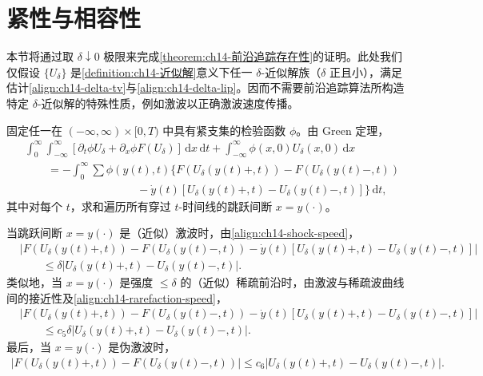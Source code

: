 \documentclass[../../main.tex]{subfiles}
\begin{document}
\section{紧性与相容性}\label{section:ch14-紧性与相容性}

本节将通过取 $\delta\downarrow0$ 极限来完成\cref{theorem:ch14-前沿追踪存在性}的证明。此处我们仅假设 $\{U_\delta\}$ 是\cref{definition:ch14-近似解}意义下任一 $\delta$-近似解族（$\delta$ 正且小），满足估计\eqref{align:ch14-delta-tv}与\eqref{align:ch14-delta-lip}。因而不需要前沿追踪算法所构造特定 $\delta$-近似解的特殊性质，例如激波以正确激波速度传播。

固定任一在 $(-\infty,\infty)\times[0,T)$ 中具有紧支集的检验函数 $\phi$。由 Green 定理，
\begin{align}
&\int_0^\infty\int_{-\infty}^\infty[\partial_t\phi U_\delta+\partial_x\phi F(U_\delta)]\,\mathrm{d}x\,\mathrm{d}t+\int_{-\infty}^\infty\phi(x,0)U_\delta(x,0)\,\mathrm{d}x\nonumber\\
&\qquad=-\int_0^\infty\sum\phi(y(t),t)\{F(U_\delta(y(t)+,t))-F(U_\delta(y(t)-,t))\nonumber\\
&\qquad\qquad\qquad\qquad\qquad-\dot y(t)[U_\delta(y(t)+,t)-U_\delta(y(t)-,t)]\}\,\mathrm{d}t,
\label{align:ch14-green}
\end{align}
其中对每个 $t$，求和遍历所有穿过 $t$-时间线的跳跃间断 $x=y(\cdot)$。

当跳跃间断 $x=y(\cdot)$ 是（近似）激波时，由\eqref{align:ch14-shock-speed}，
\begin{align}
&|F(U_\delta(y(t)+,t))-F(U_\delta(y(t)-,t))-\dot y(t)[U_\delta(y(t)+,t)-U_\delta(y(t)-,t)]|\nonumber\\
&\qquad\leqslant\delta|U_\delta(y(t)+,t)-U_\delta(y(t)-,t)|.
\label{align:ch14-residual-shock}
\end{align}
类似地，当 $x=y(\cdot)$ 是强度 $\leqslant\delta$ 的（近似）稀疏前沿时，由激波与稀疏波曲线间的接近性及\eqref{align:ch14-rarefaction-speed}，
\begin{align}
&|F(U_\delta(y(t)+,t))-F(U_\delta(y(t)-,t))-\dot y(t)[U_\delta(y(t)+,t)-U_\delta(y(t)-,t)]|\nonumber\\
&\qquad\leqslant c_5\delta|U_\delta(y(t)+,t)-U_\delta(y(t)-,t)|.
\label{align:ch14-residual-rarefaction}
\end{align}
最后，当 $x=y(\cdot)$ 是伪激波时，
\begin{align}
|F(U_\delta(y(t)+,t))-F(U_\delta(y(t)-,t))|\leqslant c_6|U_\delta(y(t)+,t)-U_\delta(y(t)-,t)|.
\label{align:ch14-residual-pseudo}
\end{align}
\end{document}
